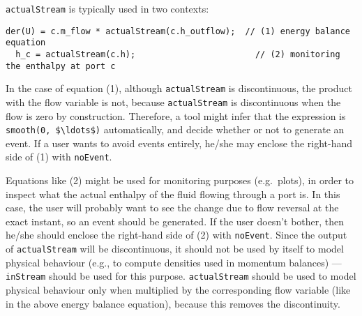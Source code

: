 \begin{nonnormative}
\lstinline!actualStream! is typically used in two contexts:
\begin{lstlisting}[language=modelica]
  der(U) = c.m_flow * actualStream(c.h_outflow);  // (1) energy balance equation
  h_c = actualStream(c.h);                        // (2) monitoring the enthalpy at port c
\end{lstlisting}
In the case of equation (1), although \lstinline!actualStream!
is discontinuous, the product with the flow variable is not, because
\lstinline!actualStream! is discontinuous when the flow is zero by construction.
Therefore, a tool might infer that the expression is \lstinline[mathescape=true]!smooth(0, $\ldots$)!
automatically, and decide whether or not to generate an event. If a user
wants to avoid events entirely, he/she may enclose the right-hand side
of (1) with \lstinline!noEvent!.

Equations like (2) might be used for monitoring purposes (e.g.\ plots), in order to inspect what the actual enthalpy of the fluid flowing through a port is.
In this case, the user will probably want to see the change due to flow reversal at the exact instant, so an event should be generated.  If the user doesn't
bother, then he/she should enclose the right-hand side of (2) with \lstinline!noEvent!.  Since the output of \lstinline!actualStream! will be discontinuous,
it should not be used by itself to model physical behaviour (e.g., to compute densities used in momentum balances) --- \lstinline!inStream! should be used
for this purpose.  \lstinline!actualStream! should be used to model physical behaviour only when multiplied by the corresponding flow variable (like in the
above energy balance equation), because this removes the discontinuity.
\end{nonnormative}
